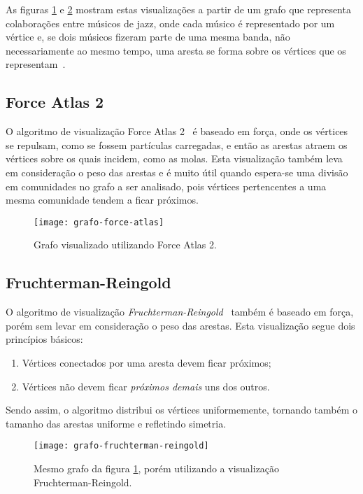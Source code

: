 As figuras \ref{fig:grafo-force-atlas} e \ref{fig:grafo-fruchterman-reingold} mostram estas visualizações a partir de um grafo que representa colaborações entre músicos de jazz, onde cada músico é representado por um vértice e, se dois músicos fizeram parte de uma mesma banda, não necessariamente ao mesmo tempo, uma aresta se forma sobre os vértices que os representam~\cite{gleiser2003list}.

\subsection{Force Atlas 2}
\label{conceitos__visualizacoes--force-atlas}

O algoritmo de visualização Force Atlas 2~\cite{jacomy2014forceatlas2} é baseado em força, onde os vértices se repulsam, como se fossem partículas carregadas, e então as arestas atraem os vértices sobre os quais incidem, como as molas. Esta visualização também leva em consideração o peso das arestas e é muito útil quando espera-se uma divisão em comunidades no grafo a ser analisado, pois vértices pertencentes a uma mesma comunidade tendem a ficar próximos.

\begin{figure}[H]
\texttt{[image: grafo-force-atlas]}
\centering
\caption{
    Grafo visualizado utilizando Force Atlas 2.
}
\label{fig:grafo-force-atlas}
\end{figure}

\subsection{Fruchterman-Reingold}
\label{conceitos__visualizacoes--fruchterman-reingold}

O algoritmo de visualização \emph{Fruchterman-Reingold}~\cite{fruchterman1991graph} também é baseado em força, porém sem levar em consideração o peso das arestas. Esta visualização segue dois princípios básicos:

\begin{enumerate}
\item Vértices conectados por uma aresta devem ficar próximos;
\item Vértices não devem ficar \emph{próximos demais} uns dos outros.
\end{enumerate}

Sendo assim, o algoritmo distribui os vértices uniformemente, tornando também o tamanho das arestas uniforme e refletindo simetria.

\begin{figure}[H]
\texttt{[image: grafo-fruchterman-reingold]}
\centering
\caption{
    Mesmo grafo da figura \ref{fig:grafo-force-atlas}, porém utilizando a visualização Fruchterman-Reingold.
}
\label{fig:grafo-fruchterman-reingold}
\end{figure}
